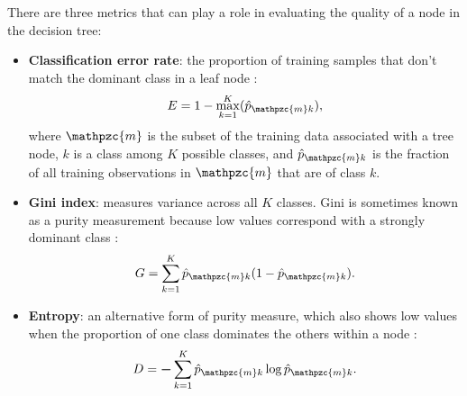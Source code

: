 There are three metrics that can play a role in evaluating the quality of a node in the decision tree:
\begin{itemize}[itemsep=2pt]\label{ch3:impurity}
    \item \textbf{Classification error rate}: the proportion of training samples that don't match the dominant class in a leaf node \citep[p.\ 312]{james_introduction_2013}:
    \begin{equation}
    \label{eq:error_rate}
        E = 1 - \max_{k=1}^K(\hat{p}_{\mathpzc{m}k}),
    \end{equation}
    where $\mathpzc{m}$ is the subset of the training data associated with a tree node, $k$ is a class among $K$ possible classes, and $\hat{p}_{\mathpzc{m}k}$ is the fraction of all training observations in $\mathpzc{m}$ that are of class $k$.
    
    \item \textbf{Gini index}: measures variance across all $K$ classes. Gini is sometimes known as a purity measurement because low values correspond with a strongly dominant class \citep[p.\ 312]{james_introduction_2013}:
    \begin{equation}
    \label{eq:gini}
        G = \sum_{k=1}^{K}{\hat{p}_{\mathpzc{m}k}(1-\hat{p}_{\mathpzc{m}k})}.
    \end{equation}
    
    \item \textbf{Entropy}: an alternative form of purity measure, which also shows low values when the proportion of one class dominates the others within a node \citep[p.\ 312]{james_introduction_2013}:
    \begin{equation}
    \label{eq:entropy}
        D = \boldsymbol{-}\sum_{k=1}^{K}\hat{p}_{\mathpzc{m}k} \log\hat{p}_{\mathpzc{m}k}.
    \end{equation}
\end{itemize}

